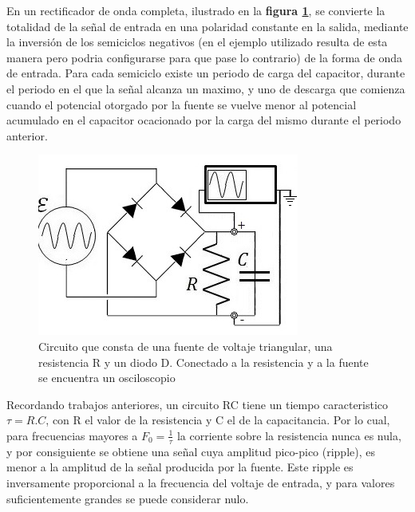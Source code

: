 \documentclass[11pt,a4paper]{article}
\begin{document}
En un rectificador de onda completa, ilustrado en la \textbf{figura \ref{fig:Rect-O}}, se convierte la totalidad de la señal de entrada en una polaridad constante en la salida, mediante la inversión de los semiciclos negativos (en el ejemplo utilizado resulta de esta manera pero podria configurarse para que pase lo contrario) de la forma de onda de entrada. Para cada semiciclo existe un periodo de carga del capacitor, durante el periodo en el que la señal alcanza un maximo,  y uno de descarga que comienza cuando el potencial otorgado por la fuente se vuelve menor al potencial acumulado en el capacitor ocacionado por la carga del mismo durante el periodo anterior.

\begin{figure}[H]
\centering
\includegraphics[scale=0.8]{Rectificador-Onda-Completa}
   \caption{Circuito que consta de una fuente de voltaje triangular, una resistencia R y un diodo D. Conectado a la resistencia y a la fuente se encuentra un osciloscopio}
   \label{fig:Rect-O}
\end{figure}

Recordando trabajos anteriores, un circuito RC tiene un tiempo caracteristico $\tau = R.C$, con R el valor de la resistencia y C el de la capacitancia. Por lo cual, para frecuencias mayores a $F_{0} = \frac{1}{\tau}$ la corriente sobre la resistencia nunca es nula, y por consiguiente se obtiene una señal cuya amplitud pico-pico (ripple), es menor a la amplitud de la señal producida por la fuente. Este ripple es inversamente proporcional a la frecuencia del voltaje de entrada, y para valores suficientemente grandes se puede considerar nulo.



\end{document}
